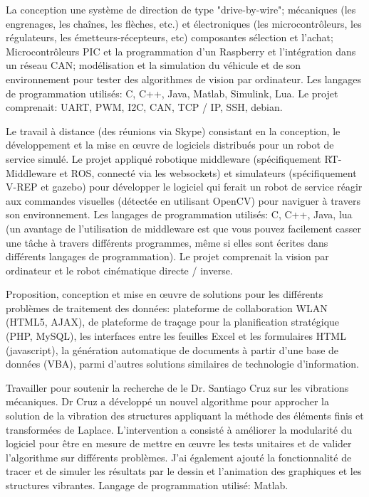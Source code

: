 \documentclass[helvetica,french,logo,notitle,totpages,utf8]{europecv2013}
\begin{document}
\begin{europecv}
{
La conception une système de direction de type "drive-by-wire"; mécaniques (les engrenages, les chaînes, les flèches, etc.) et électroniques (les microcontrôleurs, les régulateurs, les émetteurs-récepteurs, etc) composantes sélection et l'achat; Microcontrôleurs PIC et la programmation d'un Raspberry et l'intégration dans un réseau CAN; modélisation et la simulation du véhicule et de son environnement pour tester des algorithmes de vision par ordinateur. Les langages de programmation utilisés: C, C++, Java, Matlab, Simulink, Lua. Le projet comprenait: UART, PWM, I2C, CAN, TCP / IP, SSH, debian.
}

{
Le travail à distance (des réunions via Skype) consistant en la conception, le développement et la mise en œuvre de logiciels distribués pour un robot de service simulé. Le projet appliqué robotique middleware (spécifiquement RT-Middleware et ROS, connecté via les websockets) et simulateurs (spécifiquement V-REP et gazebo) pour développer le logiciel qui ferait un robot de service réagir aux commandes visuelles (détectée en utilisant OpenCV) pour naviguer à travers son environnement. Les langages de programmation utilisés: C, C++, Java, lua (un avantage de l'utilisation de middleware est que vous pouvez facilement casser une tâche à travers différents programmes, même si elles sont écrites dans différents langages de programmation). Le projet comprenait la vision par ordinateur et le robot cinématique directe / inverse.
}

{
Proposition, conception et mise en œuvre de solutions pour les différents problèmes de traitement des données: plateforme de collaboration WLAN (HTML5, AJAX), de plateforme de traçage pour la planification stratégique (PHP, MySQL), les interfaces entre les feuilles Excel et les formulaires HTML (javascript), la génération automatique de documents à partir d'une base de données (VBA), parmi d'autres solutions similaires de technologie d'information.
}

{
Travailler pour soutenir la recherche de le Dr. Santiago Cruz sur les vibrations mécaniques. Dr Cruz a développé un nouvel algorithme pour approcher la solution de la vibration des structures appliquant la méthode des éléments finis et transformées de Laplace. L'intervention a consisté à améliorer la modularité du logiciel pour être en mesure de mettre en œuvre les tests unitaires et de valider l'algorithme sur différents problèmes. J'ai également ajouté la fonctionnalité de tracer et de simuler les résultats par le dessin et l'animation des graphiques et les structures vibrantes. Langage de programmation utilisé: Matlab.
}


\end{europecv}
\end{document}

